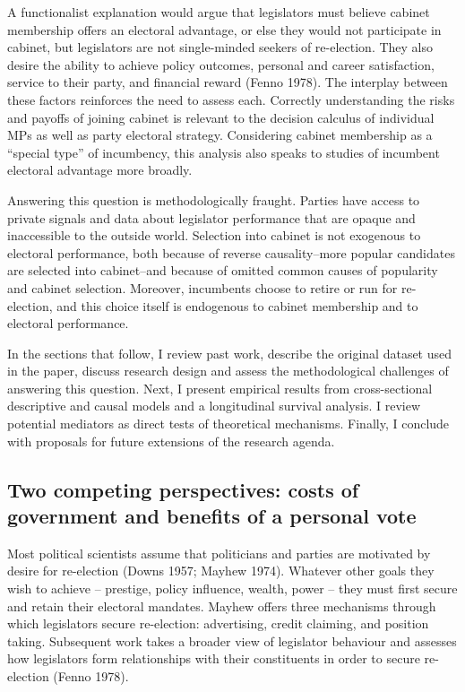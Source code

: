 \documentclass[letter,12pt]{article}
\begin{document}
A functionalist explanation would argue that legislators must believe cabinet membership offers an electoral advantage, or else they would not participate in cabinet, but legislators are not single-minded seekers of re-election. They also desire the ability to achieve policy outcomes, personal and career satisfaction, service to their party, and financial reward (Fenno 1978). The interplay between these factors reinforces the need to assess each. Correctly understanding the risks and payoffs of joining cabinet is relevant to the decision calculus of individual MPs as well as party electoral strategy. Considering cabinet membership as a ``special type'' of incumbency, this analysis also speaks to studies of incumbent electoral advantage more broadly.

Answering this question is methodologically fraught. Parties have access to private signals and data about legislator performance that are opaque and inaccessible to the outside world. Selection into cabinet is not exogenous to electoral performance, both because of reverse causality--more popular candidates are selected into cabinet--and because of omitted common causes of popularity and cabinet selection. Moreover, incumbents choose to retire or run for re-election, and this choice itself is endogenous to cabinet membership and to electoral performance.

In the sections that follow, I review past work, describe the original dataset used in the paper, discuss research design and assess the methodological challenges of answering this question. Next, I present empirical results from cross-sectional descriptive and causal models and a longitudinal survival analysis. I review potential mediators as direct tests of theoretical mechanisms. Finally, I conclude with proposals for future extensions of the research agenda.

\subsection*{Two competing perspectives: costs of government and benefits of a personal vote}

Most political scientists assume that politicians and parties are motivated by desire for re-election (Downs 1957; Mayhew 1974). Whatever other goals they wish to achieve -- prestige, policy influence, wealth, power -- they must first secure and retain their electoral mandates. Mayhew offers three mechanisms through which legislators secure re-election: advertising, credit claiming, and position taking. Subsequent work takes a broader view of legislator behaviour and assesses how legislators form relationships with their constituents in order to secure re-election (Fenno 1978).
\end{document}
